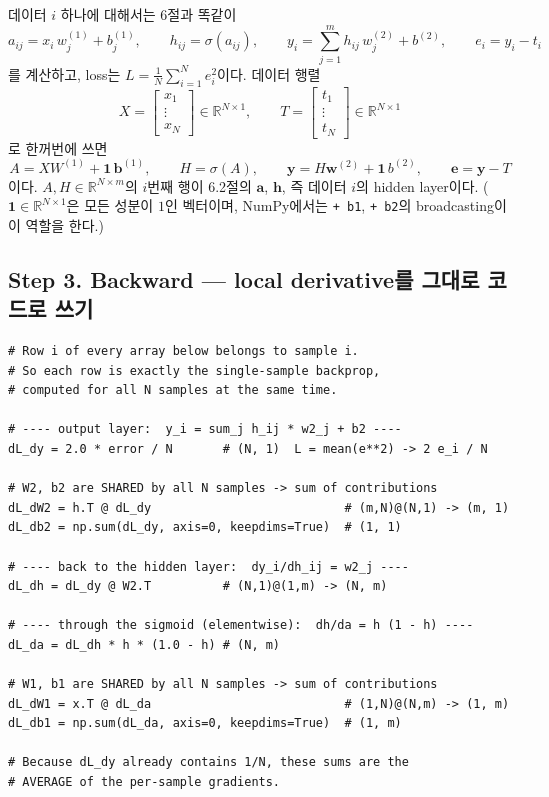 \documentclass[11pt,a4paper]{article}
\newcommand{\R}{\mathbb{R}}
\newcommand{\vect}[1]{\bm{#1}}
\newcommand{\sigmoid}{\sigma}
\begin{document}
데이터 $i$ 하나에 대해서는 6절과 똑같이
\[
a_{ij}=x_i\,w^{(1)}_j+b^{(1)}_j,
\qquad
h_{ij}=\sigmoid(a_{ij}),
\qquad
y_i=\sum_{j=1}^{m}h_{ij}\,w^{(2)}_j+b^{(2)},
\qquad
e_i=y_i-t_i
\]
를 계산하고, loss는 $L=\frac1N\sum_{i=1}^{N}e_i^2$이다.
데이터 행렬
\[
X=
\begin{bmatrix}
x_1\\ \vdots\\ x_N
\end{bmatrix}\in\R^{N\times1},
\qquad
T=
\begin{bmatrix}
t_1\\ \vdots\\ t_N
\end{bmatrix}\in\R^{N\times1}
\]
로 한꺼번에 쓰면
\[
A=XW^{(1)}+\mathbf 1\,\vect{b}^{(1)},
\qquad
H=\sigmoid(A),
\qquad
\vect{y}=H\vect{w}^{(2)}+\mathbf 1\,b^{(2)},
\qquad
\vect{e}=\vect{y}-T
\]
이다.
$A,H\in\R^{N\times m}$의 $i$번째 행이 6.2절의 $\vect{a}$, $\vect{h}$, 즉 데이터 $i$의 hidden layer이다.
($\mathbf 1\in\R^{N\times1}$은 모든 성분이 $1$인 벡터이며,
NumPy에서는 \texttt{+ b1}, \texttt{+ b2}의 broadcasting이 이 역할을 한다.)

\subsection{Step 3. Backward --- local derivative를 그대로 코드로 쓰기}

\begin{lstlisting}
# Row i of every array below belongs to sample i.
# So each row is exactly the single-sample backprop,
# computed for all N samples at the same time.

# ---- output layer:  y_i = sum_j h_ij * w2_j + b2 ----
dL_dy = 2.0 * error / N       # (N, 1)  L = mean(e**2) -> 2 e_i / N

# W2, b2 are SHARED by all N samples -> sum of contributions
dL_dW2 = h.T @ dL_dy                           # (m,N)@(N,1) -> (m, 1)
dL_db2 = np.sum(dL_dy, axis=0, keepdims=True)  # (1, 1)

# ---- back to the hidden layer:  dy_i/dh_ij = w2_j ----
dL_dh = dL_dy @ W2.T          # (N,1)@(1,m) -> (N, m)

# ---- through the sigmoid (elementwise):  dh/da = h (1 - h) ----
dL_da = dL_dh * h * (1.0 - h) # (N, m)

# W1, b1 are SHARED by all N samples -> sum of contributions
dL_dW1 = x.T @ dL_da                           # (1,N)@(N,m) -> (1, m)
dL_db1 = np.sum(dL_da, axis=0, keepdims=True)  # (1, m)

# Because dL_dy already contains 1/N, these sums are the
# AVERAGE of the per-sample gradients.
\end{lstlisting}
\end{document}
